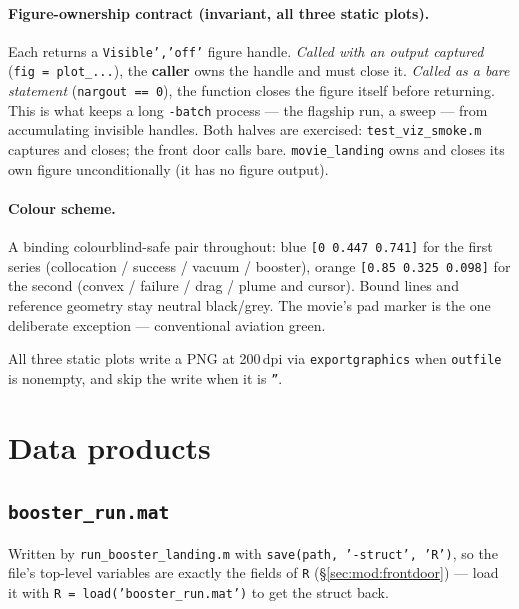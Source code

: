 \documentclass[11pt]{article}
\newcommand{\file}[1]{\texttt{#1}}
\begin{document}
\paragraph{Figure-ownership contract (invariant, all three static plots).}
Each returns a \texttt{Visible','off'} figure handle. \emph{Called with an
output captured} (\texttt{fig = plot\_...}), the \textbf{caller} owns the
handle and must close it. \emph{Called as a bare statement}
(\texttt{nargout == 0}), the function closes the figure itself before
returning. This is what keeps a long \texttt{-batch} process --- the
flagship run, a sweep --- from accumulating invisible handles. Both halves
are exercised: \file{test\_viz\_smoke.m} captures and closes; the front door
calls bare. \texttt{movie\_landing} owns and closes its own figure
unconditionally (it has no figure output).

\paragraph{Colour scheme.} A binding colourblind-safe pair throughout:
blue \texttt{[0 0.447 0.741]} for the first series (collocation / success /
vacuum / booster), orange \texttt{[0.85 0.325 0.098]} for the second (convex
/ failure / drag / plume and cursor). Bound lines and reference geometry
stay neutral black/grey. The movie's pad marker is the one deliberate
exception --- conventional aviation green.

All three static plots write a PNG at 200\,dpi via
\texttt{exportgraphics} when \texttt{outfile} is nonempty, and skip the
write when it is \texttt{''}.

\section{Data products}
\label{sec:data}

\subsection{\texttt{booster\_run.mat}}

Written by \file{run\_booster\_landing.m} with
\texttt{save(path, '-struct', 'R')}, so the file's top-level variables are
exactly the fields of \texttt{R} (\S\ref{sec:mod:frontdoor}) --- load it
with \texttt{R = load('booster\_run.mat')} to get the struct back.
\end{document}

